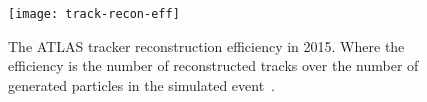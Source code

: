 \begin{figure}[ht]
  \centering
  \texttt{[image: track-recon-eff]}
  \caption[ATLAS track reconstruction efficiency.]{The ATLAS tracker
    reconstruction efficiency in 2015. Where the efficiency is the number of
    reconstructed tracks over the number of generated particles in the simulated
    event~\cite{ATL-PHYS-PUB-2015-018}.
  }
  \label{fig:track-eff}
\end{figure}
